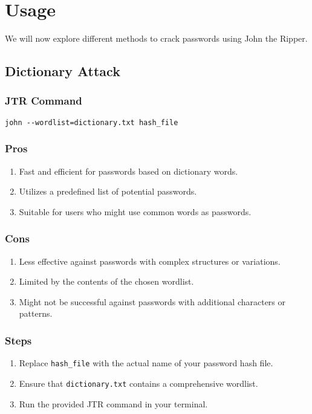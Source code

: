 \documentclass[11pt]{article}
\begin{document}
\section{Usage}
We will now explore different methods to crack passwords using John the Ripper.
\subsection{Dictionary Attack}

\subsubsection{JTR Command}

\begin{verbatim}
john --wordlist=dictionary.txt hash_file
\end{verbatim}

\subsubsection{Pros}

\begin{enumerate}
    \item Fast and efficient for passwords based on dictionary words.
    \item Utilizes a predefined list of potential passwords.
    \item Suitable for users who might use common words as passwords.
\end{enumerate}

\subsubsection{Cons}

\begin{enumerate}
    \item Less effective against passwords with complex structures or variations.
    \item Limited by the contents of the chosen wordlist.
    \item Might not be successful against passwords with additional characters or patterns.
\end{enumerate}

\subsubsection{Steps}

\begin{enumerate}
    \item Replace \texttt{hash\_file} with the actual name of your password hash file.
    \item Ensure that \texttt{dictionary.txt} contains a comprehensive wordlist.
    \item Run the provided JTR command in your terminal.
\end{enumerate}
\end{document}
